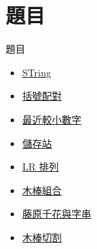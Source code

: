 \documentclass[mathserif]{beamer}
\begin{document}
\section{題目}

\begin{frame}{題目}
    \begin{itemize}
        \item \href{https://atcoder.jp/contests/agc005/tasks/agc005_a}{STring}
        \item \href{https://codeforces.com/contest/612/problem/C}{括號配對}
        \item \href{https://cses.fi/problemset/task/1645}{最近較小數字}
        \item \href{https://atcoder.jp/contests/abc247/tasks/abc247_d}{儲存站}
        \item \href{https://atcoder.jp/contests/abc237/tasks/abc237_d}{LR 排列}
        \item \href{https://cses.fi/problemset/task/1161/}{木棒組合}
        \item \href{https://codeforces.com/group/H0qY3QmnOW/contest/333897/problem/H}{藤原千花與字串}
        \item \href{https://atcoder.jp/contests/abc217/tasks/abc217_d}{木棒切割}
    \end{itemize}
\end{frame}
\end{document}

